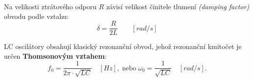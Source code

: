       Na velikosti ztrátového odporu \(R\) závisí velikost činitele tlumení \emph{(damping factor)} 
      obvodu podle vztahu:
      \begin{equation}\label{AES:eq_osc01}
        \delta = \frac{R}{2L} \qquad [rad/s]
      \end{equation}
      
      LC oscilátory obsahují klasický rezonanční obvod, jehož rezonanční kmitočet je určen 
      \textbf{Thomsonovým vztahem}:
      \begin{equation}\label{AES:eq_osc03}
        f_0 = \frac{1}{2\pi\cdot\sqrt{LC}} \quad [Hz], \;\text{nebo}\; 
        \omega_0 = \frac{1}{\sqrt{LC}} \quad [rad/s].
      \end{equation}
      
